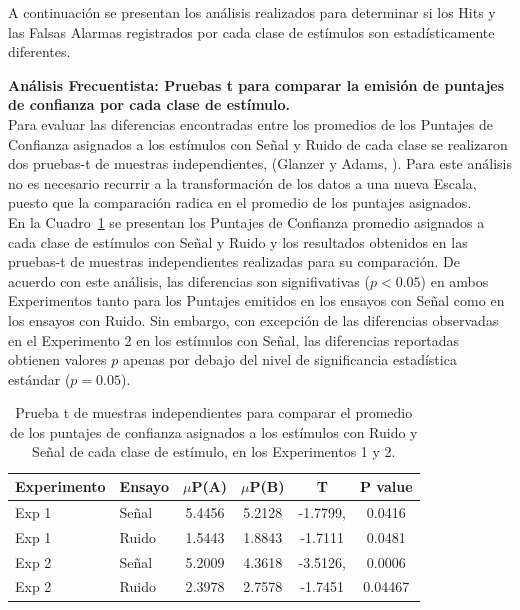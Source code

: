 A continuación se presentan los análisis realizados para determinar si los Hits y las Falsas Alarmas registrados por cada clase de estímulos son estadísticamente diferentes.

\textbf{Análisis Frecuentista: Pruebas t para comparar la emisión de puntajes de confianza por cada clase de estímulo.}\\

Para evaluar las diferencias encontradas entre los promedios de los Puntajes de Confianza asignados a los estímulos con Señal y Ruido de cada clase se realizaron  dos pruebas-t de muestras independientes, (Glanzer y Adams, \citeyear{Glanzer1990}). Para este análisis no es necesario recurrir a la transformación de los datos a una nueva Escala, puesto que la comparación radica en el promedio de los puntajes asignados.\\

En la Cuadro~\ref{Cuadro_t-Confidence} se presentan los Puntajes de Confianza promedio asignados a cada clase de estímulos con Señal y Ruido y los resultados obtenidos en las pruebas-t de muestras independientes realizadas para su comparación. De acuerdo con este análisis, las diferencias son signifivativas ($p<0.05$) en ambos Experimentos tanto para los Puntajes emitidos  en los ensayos con Señal como en los ensayos con Ruido. Sin embargo, con excepción de las diferencias observadas en el Experimento 2 en los estímulos con Señal, las diferencias reportadas obtienen valores $p$ apenas por debajo del nivel de significancia estadística estándar ($p=0$.$05$).\\

\begin{table}[h]
\caption[Prueba t para evaluar las diferencias entre los puntajes de confianza asignados en promedio a los estímulos con señal y ruido de cada clase]{Prueba t de muestras independientes para comparar el promedio de los puntajes de confianza asignados a los estímulos con Ruido y Señal de cada clase de estímulo, en los Experimentos 1 y 2.}
\label{Cuadro_t-Confidence}
\centering
\begin{tabular}{l l |  c c c c}
\toprule
\textbf{Experimento} & \textbf{Ensayo} & \textbf{$\mu$P(A)} & \textbf{$\mu$P(B)} & \textbf{T} & \textbf{P value}\\
\midrule
Exp 1 & Señal & 5.4456 & 5.2128 & -1.7799, & 0.0416 \\
Exp 1 & Ruido & 1.5443 & 1.8843 & -1.7111 & 0.0481 \\
Exp 2 & Señal & 5.2009 & 4.3618  & -3.5126, & 0.0006 \\
Exp 2 & Ruido & 2.3978 & 2.7578 & -1.7451 & 0.04467 \\
\bottomrule
\end{tabular}
\end{table}


